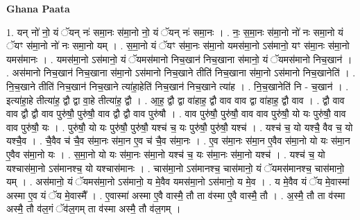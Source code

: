 \documentclass[17pt]{extarticle}
\begin{document}
\textbf{Ghana Paata } \newline

1. यन् नो॑ नो॒ यं ॅयन् नः॑ समा॒नः स॑मा॒नो नो॒ यं ॅयन् नः॑ समा॒नः । . नः॒ स॒मा॒नः स॑मा॒नो नो॑ नः समा॒नो यं ॅयꣳ स॑मा॒नो नो॑ नः समा॒नो यम् । . स॒मा॒नो यं ॅयꣳ स॑मा॒नः स॑मा॒नो यमस॑मा॒नो ऽस॑मानो॒ यꣳ स॑मा॒नः स॑मा॒नो 
यमस॑मानः । . यमस॑मा॒नो ऽस॑मानो॒ यं ॅयमस॑मानो निच॒खान॑ निच॒खाना स॑मानो॒ यं ॅयमस॑मानो निच॒खान॑ । . अस॑मानो निच॒खान॑ निच॒खाना स॑मा॒नो ऽस॑मानो निच॒खाने तीति॑ निच॒खाना स॑मा॒नो ऽस॑मानो निच॒खानेति॑ । . नि॒च॒खाने तीति॑ निच॒खान॑ निच॒खाने त्या॑हा॒हेति॑ निच॒खान॑ निच॒खाने त्या॑ह । . नि॒च॒खानेति॑ नि - च॒खान॑ । . इत्या॑हा॒हे तीत्या॑ह॒ द्वौ द्वा वा॒हे तीत्या॑ह॒ द्वौ । . आ॒ह॒ द्वौ द्वा वा॑हाह॒ द्वौ वाव वाव द्वा वा॑हाह॒ द्वौ वाव । . द्वौ वाव वाव द्वौ द्वौ वाव पुरु॑षौ॒ पुरु॑षौ॒ वाव द्वौ द्वौ वाव पुरु॑षौ । . वाव पुरु॑षौ॒ पुरु॑षौ॒ वाव वाव पुरु॑षौ॒ यो यः पुरु॑षौ॒ वाव वाव पुरु॑षौ॒ यः । . पुरु॑षौ॒ यो यः पुरु॑षौ॒ पुरु॑षौ॒ यश्च॑ च॒ यः पुरु॑षौ॒ पुरु॑षौ॒ यश्च॑ । . यश्च॑ च॒ यो यश्चै॒ वैव च॒ यो यश्चै॒व । . चै॒वैव च॑ चै॒व स॑मा॒नः स॑मा॒न ए॒व च॑ चै॒व स॑मा॒नः । . ए॒व स॑मा॒नः स॑मा॒न ए॒वैव स॑मा॒नो यो यः स॑मा॒न ए॒वैव स॑मा॒नो यः । . स॒मा॒नो यो यः स॑मा॒नः स॑मा॒नो यश्च॑ च॒ यः स॑मा॒नः स॑मा॒नो यश्च॑ । . यश्च॑ च॒ यो यश्चास॑मा॒नो ऽस॑मानश्च॒ यो यश्चास॑मानः । . चास॑मा॒नो ऽस॑मानश्च॒ चास॑मानो॒ यं ॅयमस॑मानश्च॒ चास॑मानो॒ यम् । . अस॑मानो॒ यं ॅयमस॑मा॒नो ऽस॑मानो॒ य मे॒वैव यमस॑मा॒नो ऽस॑मानो॒ य मे॒व । . य मे॒वैव यं ॅय मे॒वास्मा॑ अस्मा ए॒व यं ॅय मे॒वास्मै᳚ । . ए॒वास्मा॑ अस्मा ए॒वै वास्मै॒ तौ ता व॑स्मा ए॒वै वास्मै॒ तौ । . अ॒स्मै॒ तौ ता व॑स्मा अस्मै॒ तौ व॑ल॒गं ॅव॑ल॒गम् ता व॑स्मा अस्मै॒ तौ व॑ल॒गम् । \newline
\end{document}
